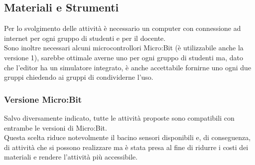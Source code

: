 \documentclass[../../relazione.tex]{subfiles}
\begin{document}
\subsection{Materiali e Strumenti}
Per lo svolgimento delle attività è necessario un computer con connessione ad internet per ogni gruppo di studenti e per il docente.\\
Sono inoltre necessari alcuni microcontrollori Micro:Bit (è utilizzabile anche la versione 1), sarebbe ottimale averne uno per ogni gruppo di studenti ma, dato che l'editor ha un simulatore integrato, è anche accettabile fornirne uno ogni due gruppi chiedendo ai gruppi di condividerne l'uso.

\subsubsection{Versione Micro:Bit}
Salvo diversamente indicato, tutte le attività proposte sono compatibili con entrambe le versioni di Micro:Bit.\\
Questa scelta riduce notevolmente il bacino sensori disponibili e, di conseguenza, di attività che si possono realizzare ma è stata presa al fine di ridurre i costi dei materiali e rendere l'attività più accessibile.
\end{document}
